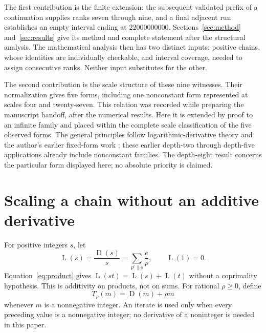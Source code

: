 \documentclass[11pt]{article}
\newcommand{\D}{\operatorname{D}}
\newcommand{\Lrate}{\operatorname{L}}
\theoremstyle{definition}
\theoremstyle{remark}
\begin{document}
The first contribution is the finite extension: the subsequent validated
prefix of a continuation supplies ranks seven through nine, and a final
adjacent run establishes an empty interval ending at $22000000000$.
Sections~\ref{sec:method} and~\ref{sec:results} give its method and
complete statement after the structural analysis. The mathematical analysis then has
two distinct inputs: positive chains, whose identities are individually
checkable, and interval coverage, needed to assign consecutive ranks.
Neither input substitutes for the other.

The second contribution is the scale structure of these nine witnesses.
Their normalization gives five forms, including one nonconstant form
represented at scales four and twenty-seven. This relation was recorded
while preparing the manuscript handoff, after the numerical results.
Here it is extended by proof to an infinite family and placed within
the complete scale classification of the five observed forms.
The general principles follow logarithmic-derivative theory
\cite{ufnarovski,kovic} and the author's earlier fixed-form work
\cite{corti2,corti5,corti6,corti7}; these earlier depth-two through
depth-five applications already include nonconstant families. The
depth-eight result concerns the particular form displayed here; no
absolute priority is claimed.

\section{Scaling a chain without an additive derivative}\label{sec:scales}

For positive integers $s$, let
\begin{equation}\label{eq:rate}
 \Lrate(s)=\frac{\D(s)}{s}
   =\sum_{p^e\parallel s}\frac{e}{p},\qquad \Lrate(1)=0.
\end{equation}
Equation~\eqref{eq:product} gives
$\Lrate(st)=\Lrate(s)+\Lrate(t)$ without a coprimality hypothesis.
This is additivity on products, not on sums.
For rational $\rho\ge0$, define
\begin{equation}\label{eq:shift}
 T_\rho(m)=\D(m)+\rho m
\end{equation}
whenever $m$ is a nonnegative integer. An iterate is used only when
every preceding value is a nonnegative integer; no derivative of a
noninteger is needed in this paper.
\end{document}
